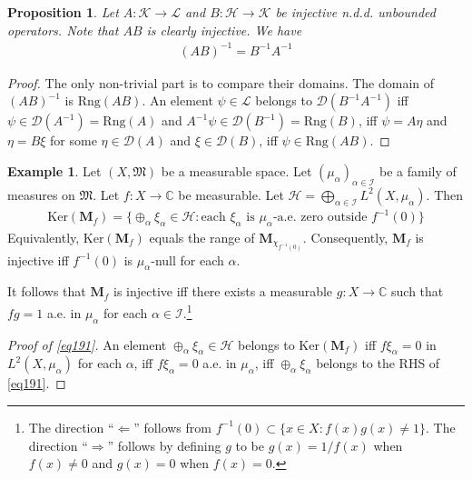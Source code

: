 \documentclass[12pt,b5paper,notitlepage]{article}
\theoremstyle{definition}
\newtheorem{eg}[df]{Example}
\theoremstyle{plain}
\newtheorem{pp}[df]{Proposition}
\newcommand{\fk}{\mathfrak}
\newcommand{\Dom}{\mathscr{D}}
\newcommand{\Cbb}{\mathbb C}
\newcommand{\Ker}{\mathrm{Ker}}
\newcommand{\Rng}{\mathrm{Rng}}
\newcommand{\MH}{\mathcal H}
\newcommand{\MK}{\mathcal K}
\newcommand{\ML}{\mathcal L}
\newcommand{\SI}{\mathscr I}
\newcommand{\Mbf}{\mathbf M}
\numberwithin{equation}{section}
\begin{document}
\begin{pp}\label{lb455}
Let $A:\MK\rightarrow\ML$ and $B:\MH\rightarrow\MK$ be injective n.d.d. unbounded operators. Note that $AB$ is clearly injective. We have
\begin{align*}
(AB)^{-1}=B^{-1}A^{-1}
\end{align*}
\end{pp}

\begin{proof}
The only non-trivial part is to compare their domains. The domain of $(AB)^{-1}$ is $\Rng(AB)$. An element $\psi\in\ML$ belongs to $\Dom(B^{-1}A^{-1})$ iff $\psi\in\Dom(A^{-1})=\Rng(A)$ and $A^{-1}\psi\in\Dom(B^{-1})=\Rng(B)$, iff $\psi=A\eta$ and $\eta=B\xi$ for some $\eta\in\Dom(A)$ and $\xi\in\Dom(B)$, iff $\psi\in\Rng(AB)$.
\end{proof}







\begin{eg}\label{lb372}
Let $(X,\fk M)$ be a measurable space. Let $(\mu_\alpha)_{\alpha\in\SI}$ be a family of measures on $\fk M$. Let $f:X\rightarrow\Cbb$ be measurable. Let $\MH=\bigoplus_{\alpha\in\SI}L^2(X,\mu_\alpha)$. Then
\begin{align}\label{eq191}
\Ker(\Mbf_f)=\Big\{\oplus_\alpha\xi_\alpha\in\MH:\text{each }\xi_\alpha\text{ is }\mu_\alpha\text{-a.e. zero outside }f^{-1}(0) \Big\}
\end{align}
Equivalently, $\Ker(\Mbf_f)$ equals the range of $\Mbf_{\chi_{f^{-1}(0)}}$. Consequently, $\Mbf_f$ is injective iff $f^{-1}(0)$ is $\mu_\alpha$-null for each $\alpha$.
\end{eg}

It follows that $\Mbf_f$ is injective iff there exists a measurable $g:X\rightarrow\Cbb$ such that $fg=1$ a.e. in $\mu_\alpha$ for each $\alpha\in\SI$.\footnote{The direction ``$\Leftarrow$'' follows from $f^{-1}(0)\subset\{x\in X:f(x)g(x)\neq1\}$. The direction ``$\Rightarrow$'' follows by defining $g$ to be $g(x)=1/f(x)$ when $f(x)\neq0$ and $g(x)=0$ when $f(x)=0$.}


\begin{proof}[Proof of \eqref{eq191}]
An element $\oplus_\alpha\xi_\alpha\in\MH$ belongs to $\Ker(\Mbf_f)$ iff $f\xi_\alpha=0$ in $L^2(X,\mu_\alpha)$ for each $\alpha$, iff $f\xi_\alpha=0$ a.e. in $\mu_\alpha$, iff $\oplus_\alpha\xi_\alpha$ belongs to the RHS of \eqref{eq191}.
\end{proof}
\end{document}
